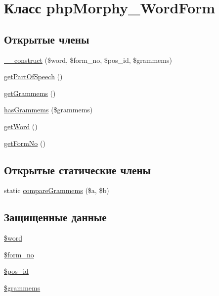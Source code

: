 \hypertarget{classphpMorphy__WordForm}{
\section{Класс phpMorphy\_\-WordForm}
\label{classphpMorphy__WordForm}
}
\subsection*{Открытые члены}
\begin{DoxyCompactItemize}
\item 
\hyperlink{classphpMorphy__WordForm_a57a5ca946c63b7d49ba519b719b40f2b}{\_\-\_\-construct} (\$word, \$form\_\-no, \$pos\_\-id, \$grammems)
\item 
\hyperlink{classphpMorphy__WordForm_a9861e77c88e9b3966d5e50089127712a}{getPartOfSpeech} ()
\item 
\hyperlink{classphpMorphy__WordForm_a7e4ddd51ea921f774c80437ee6aec77d}{getGrammems} ()
\item 
\hyperlink{classphpMorphy__WordForm_aff0be73663258a2080901a88e6d78681}{hasGrammems} (\$grammems)
\item 
\hyperlink{classphpMorphy__WordForm_af38e66762319005f1a6d7db1c6161d12}{getWord} ()
\item 
\hyperlink{classphpMorphy__WordForm_a7a4859416b3d8ec164422419893e0338}{getFormNo} ()
\end{DoxyCompactItemize}
\subsection*{Открытые статические члены}
\begin{DoxyCompactItemize}
\item 
static \hyperlink{classphpMorphy__WordForm_a9cdc1e42f5c478b6816b8e220d1cea6c}{compareGrammems} (\$a, \$b)
\end{DoxyCompactItemize}
\subsection*{Защищенные данные}
\begin{DoxyCompactItemize}
\item 
\hyperlink{classphpMorphy__WordForm_a514dcba8300120d8f21cc571738e2347}{\$word}
\item 
\hyperlink{classphpMorphy__WordForm_aed67270b07f37f3504624fe0720f7db3}{\$form\_\-no}
\item 
\hyperlink{classphpMorphy__WordForm_a7049695bc8eb986924eb9ad3e2d00e84}{\$pos\_\-id}
\item 
\hyperlink{classphpMorphy__WordForm_a483e03c07f1eb2235af107a2bb4859c0}{\$grammems}
\end{DoxyCompactItemize}


